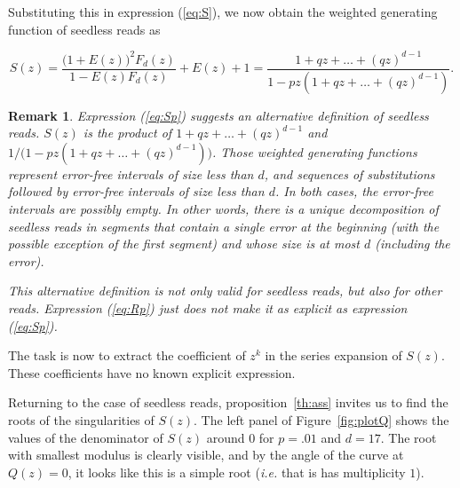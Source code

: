 \documentclass{article}
\newtheorem{remark}{Remark}
\begin{document}
Substituting this in expression (\ref{eq:S}), we now obtain the weighted
generating function of seedless reads as

\begin{equation}
\label{eq:Sp}
S(z) = \frac{\big(1+E(z)\big)^2F_d(z)}{1-E(z)F_d(z)} + E(z) + 1 =
\frac{1+qz + \ldots + (qz)^{d-1}}{1-pz(1+qz + \ldots +
(qz)^{d-1})}.
\end{equation}

\begin{remark}
\label{rem:alt}
Expression (\ref{eq:Sp}) suggests an alternative definition of seedless
reads. $S(z)$ is the product of $1+qz + \ldots + (qz)^{d-1}$ and
$1/\big(1-pz(1+qz + \ldots+(qz)^{d-1})\big)$. Those weighted generating
functions represent error-free intervals of size less than $d$, and
sequences of substitutions followed by error-free intervals of size less
than $d$. In both cases, the error-free intervals are possibly empty.
In other words, there is a unique decomposition of seedless reads
in segments that contain a single error at the beginning (with the
possible exception of the first segment) and whose size is at most $d$
(including the error).

This alternative definition is not only valid for seedless reads, but also
for other reads. Expression (\ref{eq:Rp}) just does not make it as
explicit as expression (\ref{eq:Sp}).
\end{remark}

The task is now to extract the coefficient of $z^k$ in the series
expansion of $S(z)$. These coefficients have no known explicit expression.

Returning to the case of seedless reads, proposition~\ref{th:ass} invites
us to find the roots of the singularities of $S(z)$. The left panel of
Figure~\ref{fig:plotQ} shows the values of the denominator of $S(z)$
around $0$ for $p=.01$ and $d=17$. The root with smallest modulus is
clearly visible, and by the angle of the curve at $Q(z) = 0$, it looks
like this is a simple root (\textit{i.e.} that is has multiplicity $1$).
\end{document}
